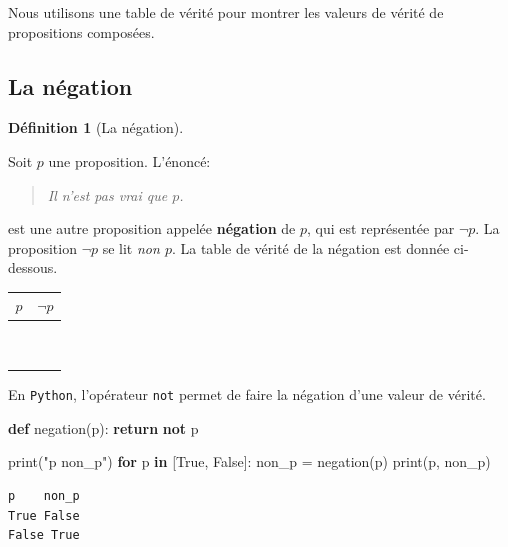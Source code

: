 \documentclass[
  letterpaper,
]{scrbook}
\newenvironment{Shaded}{\begin{snugshade}}{\end{snugshade}}
\newcommand{\BuiltInTok}[1]{\textcolor[rgb]{0.00,0.50,0.00}{#1}}
\newcommand{\ControlFlowTok}[1]{\textcolor[rgb]{0.00,0.44,0.13}{\textbf{#1}}}
\newcommand{\KeywordTok}[1]{\textcolor[rgb]{0.00,0.44,0.13}{\textbf{#1}}}
\newcommand{\NormalTok}[1]{\textcolor[rgb]{0.00,0.44,0.13}{#1}}
\newcommand{\OperatorTok}[1]{\textcolor[rgb]{0.40,0.40,0.40}{#1}}
\newcommand{\StringTok}[1]{\textcolor[rgb]{0.25,0.44,0.63}{#1}}
\newcommand{\VariableTok}[1]{\textcolor[rgb]{0.10,0.09,0.49}{#1}}
\theoremstyle{plain}
\theoremstyle{definition}
\newtheorem{definition}{Définition}[chapter]
\theoremstyle{definition}
\theoremstyle{remark}
\begin{document}
Nous utilisons une table de vérité pour montrer les valeurs de vérité de
propositions composées.

\hypertarget{la-nuxe9gation}{%
\subsection{La négation}\label{la-nuxe9gation}}

\begin{definition}[La
négation]\protect\hypertarget{def-negation}{}\label{def-negation}

Soit \(p\) une proposition. L'énoncé:

\begin{quote}
\emph{Il n'est pas vrai que \(p\).}
\end{quote}

est une autre proposition appelée \textbf{négation} de \(p\), qui est
représentée par \(\lnot p\). La proposition \(\lnot p\) se lit \emph{non
\(p\)}. La table de vérité de la négation est donnée ci-dessous.

\begin{longtable}[]{@{}cc@{}}
\toprule\noalign{}
\(p\) & \(\lnot p\) \\
\midrule\noalign{}
\endhead
\bottomrule\noalign{}
\endlastfoot
\(\phantom{V}\) & \(\phantom{V}\) \\
\(\phantom{V}\) & \(\phantom{V}\) \\
\end{longtable}

En \texttt{Python}, l'opérateur \texttt{not} permet de faire la négation
d'une valeur de vérité.

\hypertarget{negation-python}{}
\begin{Shaded}
\begin{Highlighting}[]
\KeywordTok{def}\NormalTok{ negation(p):}
    \ControlFlowTok{return} \KeywordTok{not}\NormalTok{ p}

\BuiltInTok{print}\NormalTok{(}\StringTok{"p    non\_p"}\NormalTok{)}
\ControlFlowTok{for}\NormalTok{ p }\KeywordTok{in}\NormalTok{ [}\VariableTok{True}\NormalTok{, }\VariableTok{False}\NormalTok{]:}
\NormalTok{    non\_p }\OperatorTok{=}\NormalTok{ negation(p)}
    \BuiltInTok{print}\NormalTok{(p, non\_p)}
\end{Highlighting}
\end{Shaded}

\begin{verbatim}
p    non_p
True False
False True
\end{verbatim}

\end{definition}
\end{document}
